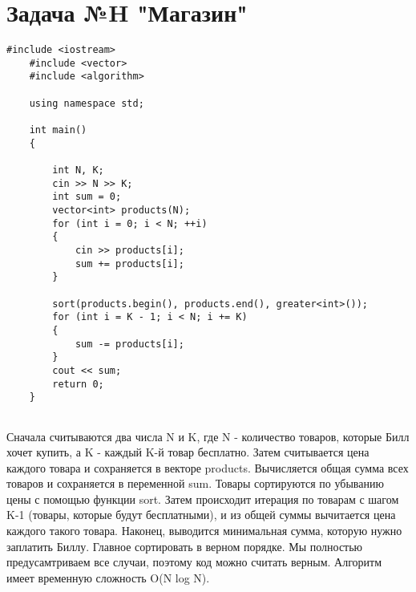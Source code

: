 \documentclass{article}
\begin{document}
\section{Задача №H "Магазин"}
\begin{lstlisting}[frame=single, basicstyle=\ttfamily, breaklines=true, breakatwhitespace=true, postbreak=\mbox{\textcolor{red}{$\hookrightarrow$}\space}]
    #include <iostream>
    #include <vector>
    #include <algorithm>
    
    using namespace std;
    
    int main()
    {
    
        int N, K;
        cin >> N >> K;
        int sum = 0;
        vector<int> products(N);
        for (int i = 0; i < N; ++i)
        {
            cin >> products[i];
            sum += products[i];
        }
    
        sort(products.begin(), products.end(), greater<int>());
        for (int i = K - 1; i < N; i += K)
        {
            sum -= products[i];
        }
        cout << sum;
        return 0;
    }
    
\end{lstlisting}
Сначала считываются два числа N и K, где N - количество товаров, которые Билл хочет купить, а K - каждый K-й товар бесплатно.
Затем считывается цена каждого товара и сохраняется в векторе products.
Вычисляется общая сумма всех товаров и сохраняется в переменной sum.
Товары сортируются по убыванию цены с помощью функции sort.
Затем происходит итерация по товарам с шагом K-1 (товары, которые будут бесплатными), и из общей суммы вычитается цена каждого такого товара.
Наконец, выводится минимальная сумма, которую нужно заплатить Биллу.
Главное сортировать в верном порядке. Мы полностью предусамтриваем все случаи, поэтому код можно считать верным.
Алгоритм имеет временную сложность O(N log N).
\end{document}
